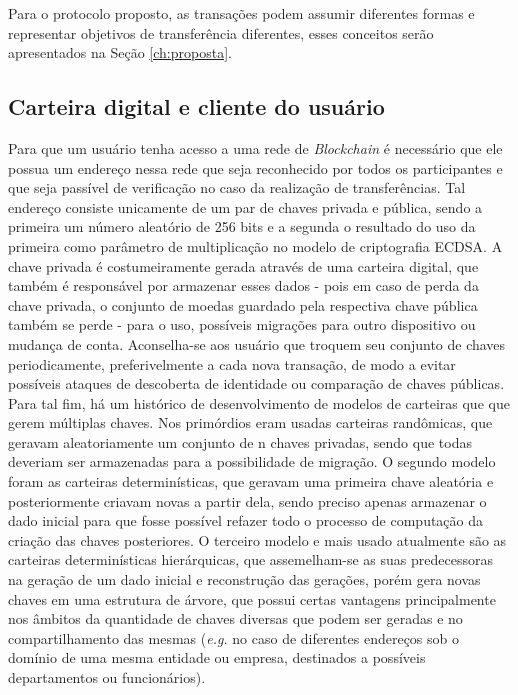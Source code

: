 Para o protocolo proposto, as transações podem assumir diferentes formas e representar objetivos de transferência diferentes, esses conceitos serão apresentados na Seção \ref{ch:proposta}.

\subsection{Carteira digital e cliente do usuário}

Para que um usuário tenha acesso a uma rede  de \textit{Blockchain} é necessário que ele possua um endereço nessa rede que seja reconhecido por todos os participantes e que seja passível de verificação no caso da realização de transferências. Tal endereço consiste unicamente de um par de chaves privada e pública, sendo a primeira um número aleatório de 256 bits e a segunda o resultado do uso da primeira como parâmetro de multiplicação no modelo de criptografia \ac{ECDSA}. A chave privada é costumeiramente gerada através de uma carteira digital, que também é responsável por armazenar esses dados - pois em caso de perda da chave privada, o conjunto de moedas guardado pela respectiva chave pública também se perde - para o uso, possíveis migrações para outro dispositivo ou mudança de conta. Aconselha-se aos usuário que troquem seu conjunto de chaves periodicamente, preferivelmente a cada nova transação, de modo a evitar possíveis ataques de descoberta de identidade ou comparação de chaves públicas. Para tal fim, há um histórico de desenvolvimento de modelos de carteiras que que gerem múltiplas chaves. Nos primórdios eram usadas carteiras randômicas, que geravam aleatoriamente um conjunto de n chaves privadas, sendo que todas deveriam ser armazenadas para a possibilidade de migração. O segundo modelo foram as carteiras determinísticas, que geravam uma primeira chave aleatória e posteriormente criavam novas a partir dela, sendo preciso apenas armazenar o dado inicial para que fosse possível refazer todo o processo de computação da criação das chaves posteriores. O terceiro modelo e mais usado atualmente são as carteiras determinísticas hierárquicas, que assemelham-se as suas predecessoras na geração de um dado inicial e reconstrução das gerações, porém gera novas chaves em uma estrutura de árvore, que possui certas vantagens principalmente nos âmbitos da quantidade de chaves diversas que podem ser geradas e no compartilhamento das mesmas (\textit{e.g.} no caso de diferentes endereços sob o domínio de uma mesma entidade ou empresa, destinados a possíveis departamentos ou funcionários).

